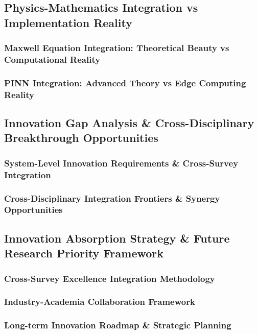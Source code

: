 \documentclass[journal]{IEEEtran}
\begin{document}
\subsection{Physics-Mathematics Integration vs Implementation Reality}
\subsubsection{Maxwell Equation Integration: Theoretical Beauty vs Computational Reality}
\subsubsection{PINN Integration: Advanced Theory vs Edge Computing Reality}

\subsection{Innovation Gap Analysis \& Cross-Disciplinary Breakthrough Opportunities}
\subsubsection{System-Level Innovation Requirements \& Cross-Survey Integration}
\subsubsection{Cross-Disciplinary Integration Frontiers \& Synergy Opportunities}

\subsection{Innovation Absorption Strategy \& Future Research Priority Framework}
\subsubsection{Cross-Survey Excellence Integration Methodology}
\subsubsection{Industry-Academia Collaboration Framework}
\subsubsection{Long-term Innovation Roadmap \& Strategic Planning}

\end{document}
